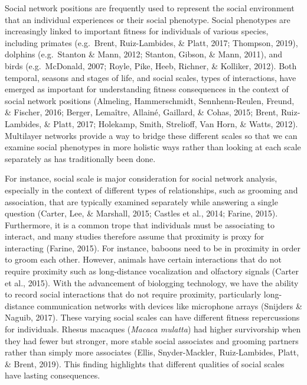 \documentclass[]{article}
\begin{document}
Social network positions are frequently used to represent the social environment
that an individual experiences or their social phenotype. Social phenotypes are
increasingly linked to important fitness for individuals of various species,
including primates (e.g.~Brent, Ruiz-Lambides, \& Platt, 2017; Thompson, 2019),
dolphins (e.g.~Stanton \& Mann, 2012; Stanton, Gibson, \& Mann, 2011), and birds
(e.g.~McDonald, 2007; Royle, Pike, Heeb, Richner, \& Kolliker, 2012). Both
temporal, seasons and stages of life, and social scales, types of interactions,
have emerged as important for understanding fitness consequences in the context
of social network positions (Almeling, Hammerschmidt, Sennhenn-Reulen, Freund, \&
Fischer, 2016; Berger, Lemaître, Allainé, Gaillard, \& Cohas, 2015; Brent,
Ruiz-Lambides, \& Platt, 2017; Holekamp, Smith, Strelioff, Van Horn, \& Watts,
2012). Multilayer networks provide a way to bridge these different scales so
that we can examine social phenotypes in more holistic ways rather than looking
at each scale separately as has traditionally been done.

For instance, social scale is major consideration for social network analysis,
especially in the context of different types of relationships, such as grooming
and association, that are typically examined separately while answering a single
question (Carter, Lee, \& Marshall, 2015; Castles et al., 2014; Farine, 2015).
Furthermore, it is a common trope that individuals must be associating to
interact, and many studies therefore assume that proximity is proxy for
interacting (Farine, 2015). For instance, baboons need to be in proximity in
order to groom each other. However, animals have certain interactions that do
not require proximity such as long-distance vocalization and olfactory signals
(Carter et al., 2015). With the advancement of biologging technology, we have
the ability to record social interactions that do not require proximity,
particularly long-distance communication networks with devices like microphone
arrays (Snijders \& Naguib, 2017). These varying social scales can have different
fitness repercussions for individuals. Rhesus macaques (\emph{Macaca mulatta}) had
higher survivorship when they had fewer but stronger, more stable social
associates and grooming partners rather than simply more associates (Ellis,
Snyder-Mackler, Ruiz-Lambides, Platt, \& Brent, 2019). This finding highlights
that different qualities of social scales have lasting consequences.
\end{document}
